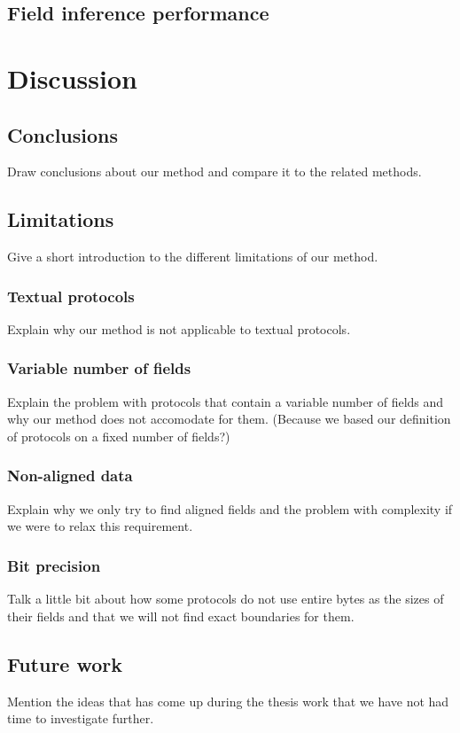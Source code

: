\documentclass[a4paper]{report}
\begin{document}
\section{Field inference performance}

\chapter{Discussion}

\section{Conclusions}
Draw conclusions about our method and compare it to the related methods.

\section{Limitations}
Give a short introduction to the different limitations of our method.

\subsection{Textual protocols}
Explain why our method is not applicable to textual protocols.

\subsection{Variable number of fields}
Explain the problem with protocols that contain a variable number of fields and
why our method does not accomodate for them. (Because we based our definition
of protocols on a fixed number of fields?)

\subsection{Non-aligned data}
Explain why we only try to find aligned fields and the problem with complexity
if we were to relax this requirement.

\subsection{Bit precision}
Talk a little bit about how some protocols do not use entire bytes as the sizes
of their fields and that we will not find exact boundaries for them.

\section{Future work}
Mention the ideas that has come up during the thesis work that we have not had
time to investigate further.
\end{document}
